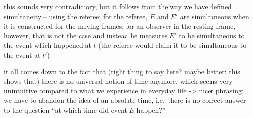 this sounds very contradictory, but it follows from the way we have defined simultaneity -- using the referee; for the referee, $E$ and $E'$ are simultaneous when it is constructed for the moving frames; for an observer in the resting frame, however, that is not the case and instead he measures $E'$ to be simultaneous to the event which happened at $t$ (the referee would claim it to be simultaneous to the event at $t'$)



it all comes down to the fact that (right thing to say here? maybe better: this shows that) there is no universal notion of time anymore, which seems very unintuitive compared to what we experience in everyday life -> nicer phrasing: we have to abandon the idea of an absolute time, i.e.~there is no correct answer to the question \enquote{at which time did event $E$ happen?}


